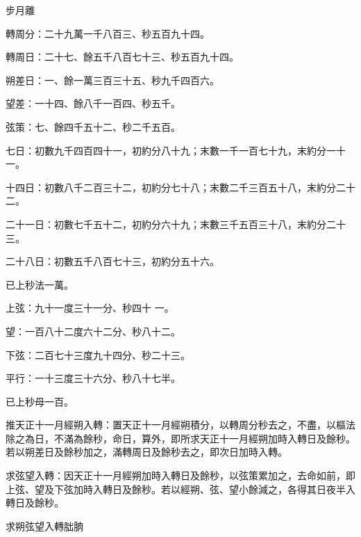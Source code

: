 \begin{pinyinscope}
 步月離



 轉周分：二十九萬一千八百三、秒五百九十四。



 轉周日：二十七、餘五千八百七十三、秒五百九十四。



 朔差日：一、餘一萬三百三十五、秒九千四百六。



 望差：一十四、餘八千一百四、秒五千。



 弦策：七、餘四千五十二、秒二千五百。



 七日：初數九千四百四十一，初約分八十九；末數一千一百七十九，末約分一十一。



 十四日：初數八千二百三十二，初約分七十八；末數二千三百五十八，末約分二十二。



 二十一日：初數七千五十二，初約分六十九；末數三千五百三十八，末約分二十三。



 二十八日：初數五千八百七十三，初約分五十六。



 已上秒法一萬。



 上弦：九十一度三十一分、秒四十
 一。



 望：一百八十二度六十二分、秒八十二。



 下弦：二百七十三度九十四分、秒二十三。



 平行：一十三度三十六分、秒八十七半。



 已上秒母一百。



 推天正十一月經朔入轉：置天正十一月經朔積分，以轉周分秒去之，不盡，以樞法除之為日，不滿為餘秒，命日，算外，即所求天正十一月經朔加時入轉日及餘秒。若以朔差日及餘秒加之，滿轉周日及餘秒去之，即次日加時入轉。



 求弦望入轉：因天正十一月經朔加時入轉日及餘秒，以弦策累加之，去命如前，即上弦、望及下弦加時入轉日及餘秒。若以經朔、弦、望小餘減之，各得其日夜半入轉日及餘秒。



 求朔弦望入轉朏朒




\end{pinyinscope}
